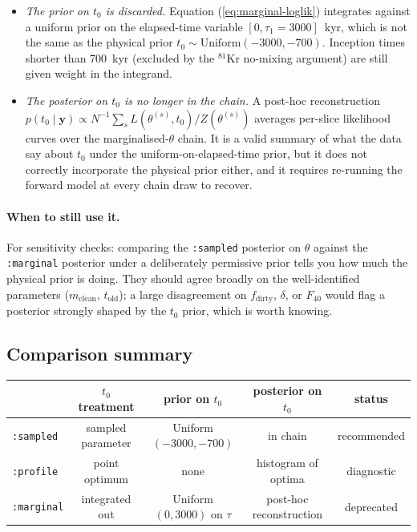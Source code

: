 \documentclass[11pt,a4paper]{article}
\newcommand{\Kr}{\ensuremath{{}^{81}\mathrm{Kr}}}
\newcommand{\tzero}{\ensuremath{t_{0}}}
\newcommand{\told}{\ensuremath{t_{\mathrm{old}}}}
\newcommand{\code}[1]{\texttt{#1}}
\begin{document}
\begin{itemize}
  \item \emph{The prior on \tzero{} is discarded.} Equation
        (\ref{eq:marginal-loglik}) integrates against a uniform prior on
        the elapsed-time variable $[0, \tau_1=3000]$~kyr, which is not the
        same as the physical prior $\tzero \sim
        \mathrm{Uniform}(-3000, -700)$. Inception times shorter than
        700~kyr (excluded by the \Kr{} no-mixing argument) are still given
        weight in the integrand.
  \item \emph{The posterior on \tzero{} is no longer in the chain.} A
        post-hoc reconstruction $p(\tzero \mid \mathbf{y}) \propto
        N^{-1}\sum_s L(\theta^{(s)}, \tzero) / Z(\theta^{(s)})$ averages
        per-slice likelihood curves over the marginalised-$\theta$ chain.
        It is a valid summary of what the data say about \tzero{} under
        the uniform-on-elapsed-time prior, but it does not correctly
        incorporate the physical prior either, and it requires re-running
        the forward model at every chain draw to recover.
\end{itemize}

\paragraph{When to still use it.}
For sensitivity checks: comparing the \code{:sampled} posterior on $\theta$
against the \code{:marginal} posterior under a deliberately permissive
prior tells you how much the physical prior is doing. They should agree
broadly on the well-identified parameters ($m_{\mathrm{clean}}$, \told{}); a
large disagreement on $f_{\mathrm{dirty}}$, $\delta$, or $F_{40}$ would
flag a posterior strongly shaped by the \tzero{} prior, which is worth
knowing.

\subsection{Comparison summary}

\begin{center}
\small
\begin{tabular}{lcccc}
\toprule
& \tzero{} treatment & prior on \tzero{} & posterior on \tzero{} & status \\
\midrule
\code{:sampled}  & sampled parameter & Uniform$(-3000,-700)$ & in chain & recommended \\
\code{:profile}  & point optimum     & none                  & histogram of optima & diagnostic \\
\code{:marginal} & integrated out    & Uniform$(0, 3000)$ on $\tau$ & post-hoc reconstruction & deprecated \\
\bottomrule
\end{tabular}
\end{center}
\end{document}
